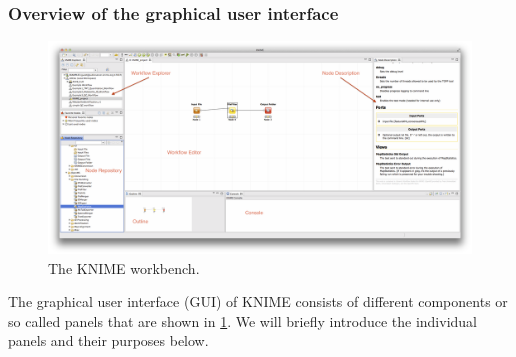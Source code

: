 \subsubsection{Overview of the graphical user interface}

\begin{figure}
\includegraphics[width=\textwidth]{graphics/knime_setup/knime_workbench_marked}
\caption{The KNIME workbench.}
\label{fig:knime_workbench}
\end{figure}

The graphical user interface (GUI) of KNIME consists of different components or so called panels that are shown in \cref{fig:knime_workbench}.
We will briefly introduce the individual panels and their purposes below.

